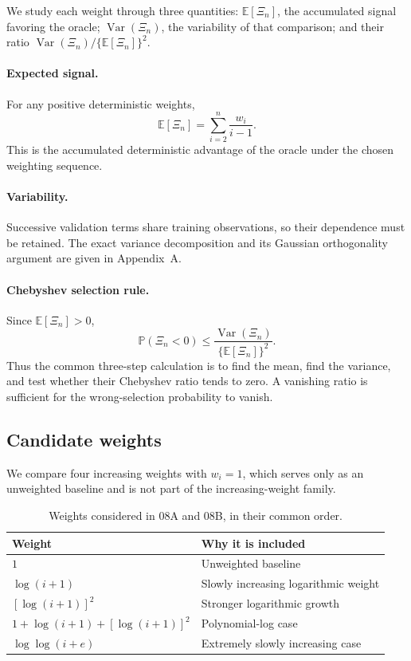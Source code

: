 \documentclass[11pt]{article}
\begin{document}
We study each weight through three quantities: $\mathbb E[\Xi_n]$, the
accumulated signal favoring the oracle; $\operatorname{Var}(\Xi_n)$, the
variability of that comparison; and their ratio
$\operatorname{Var}(\Xi_n)/\{\mathbb E[\Xi_n]\}^2$.

\paragraph{Expected signal.}
For any positive deterministic weights,
\begin{equation}
\mathbb E[\Xi_n]=\sum_{i=2}^n\frac{w_i}{i-1}.
\label{eq:mean}
\end{equation}
This is the accumulated deterministic advantage of the oracle under the
chosen weighting sequence.

\paragraph{Variability.}
Successive validation terms share training observations, so their dependence
must be retained.  The exact variance decomposition and its Gaussian
orthogonality argument are given in Appendix~A.

\paragraph{Chebyshev selection rule.}
Since $\mathbb E[\Xi_n]>0$,
\begin{equation}
\mathbb P(\Xi_n<0)
\leq\frac{\operatorname{Var}(\Xi_n)}{\{\mathbb E[\Xi_n]\}^2}.
\label{eq:chebyshev}
\end{equation}
Thus the common three-step calculation is to find the mean, find the
variance, and test whether their Chebyshev ratio tends to zero.  A vanishing
ratio is sufficient for the wrong-selection probability to vanish.

\subsection{Candidate weights}

We compare four increasing weights with $w_i=1$, which serves only as an
unweighted baseline and is not part of the increasing-weight family.

\begin{table}[H]
\centering
\begin{tabular}{@{}ll@{}}
\toprule
Weight & Why it is included \\
\midrule
$1$ & Unweighted baseline \\
$\log(i+1)$ & Slowly increasing logarithmic weight \\
$[\log(i+1)]^2$ & Stronger logarithmic growth \\
$1+\log(i+1)+[\log(i+1)]^2$ & Polynomial-log case \\
$\log\log(i+e)$ & Extremely slowly increasing case \\
\bottomrule
\end{tabular}
\caption{Weights considered in 08A and 08B, in their common order.}
\end{table}
\end{document}
